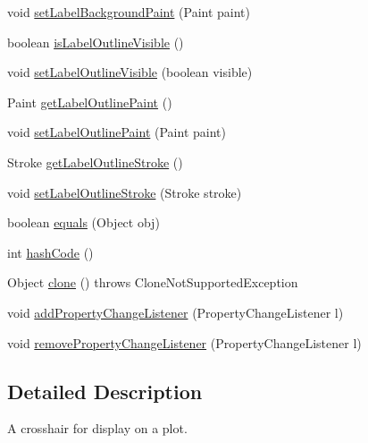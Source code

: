 \begin{DoxyCompactItemize}
\item 
void \mbox{\hyperlink{classorg_1_1jfree_1_1chart_1_1plot_1_1_crosshair_ac9af1982e63da81f4b921beb1dd4fbc0}{set\+Label\+Background\+Paint}} (Paint paint)
\item 
boolean \mbox{\hyperlink{classorg_1_1jfree_1_1chart_1_1plot_1_1_crosshair_a92ee3a27945a3c6d16aee1431700b233}{is\+Label\+Outline\+Visible}} ()
\item 
void \mbox{\hyperlink{classorg_1_1jfree_1_1chart_1_1plot_1_1_crosshair_aaaf481eb9eccc5fa2b4f2a972f1aa1be}{set\+Label\+Outline\+Visible}} (boolean visible)
\item 
Paint \mbox{\hyperlink{classorg_1_1jfree_1_1chart_1_1plot_1_1_crosshair_ac01f9a5456e085677ea18840da944de0}{get\+Label\+Outline\+Paint}} ()
\item 
void \mbox{\hyperlink{classorg_1_1jfree_1_1chart_1_1plot_1_1_crosshair_a66fecb4b6c255165fd0f116b3890f415}{set\+Label\+Outline\+Paint}} (Paint paint)
\item 
Stroke \mbox{\hyperlink{classorg_1_1jfree_1_1chart_1_1plot_1_1_crosshair_add1e46ed0170bc4cdb461d36229f481c}{get\+Label\+Outline\+Stroke}} ()
\item 
void \mbox{\hyperlink{classorg_1_1jfree_1_1chart_1_1plot_1_1_crosshair_a27fd7cb8534fb687f4f6209ec8fb1481}{set\+Label\+Outline\+Stroke}} (Stroke stroke)
\item 
boolean \mbox{\hyperlink{classorg_1_1jfree_1_1chart_1_1plot_1_1_crosshair_a1f4f7829c7c0d0ad3aeb434ffc362788}{equals}} (Object obj)
\item 
int \mbox{\hyperlink{classorg_1_1jfree_1_1chart_1_1plot_1_1_crosshair_a378a5e3fec4effff766e0c2f2cb51e8f}{hash\+Code}} ()
\item 
Object \mbox{\hyperlink{classorg_1_1jfree_1_1chart_1_1plot_1_1_crosshair_ad4d10ed5d5c50f7a08b1a1a5bdaaadb3}{clone}} ()  throws Clone\+Not\+Supported\+Exception 
\item 
void \mbox{\hyperlink{classorg_1_1jfree_1_1chart_1_1plot_1_1_crosshair_a7186ff39824e3484f1597696c8e58c3c}{add\+Property\+Change\+Listener}} (Property\+Change\+Listener l)
\item 
void \mbox{\hyperlink{classorg_1_1jfree_1_1chart_1_1plot_1_1_crosshair_a39d614618c369d9bb3aaec76a4b34a91}{remove\+Property\+Change\+Listener}} (Property\+Change\+Listener l)
\end{DoxyCompactItemize}


\subsection{Detailed Description}
A crosshair for display on a plot.

